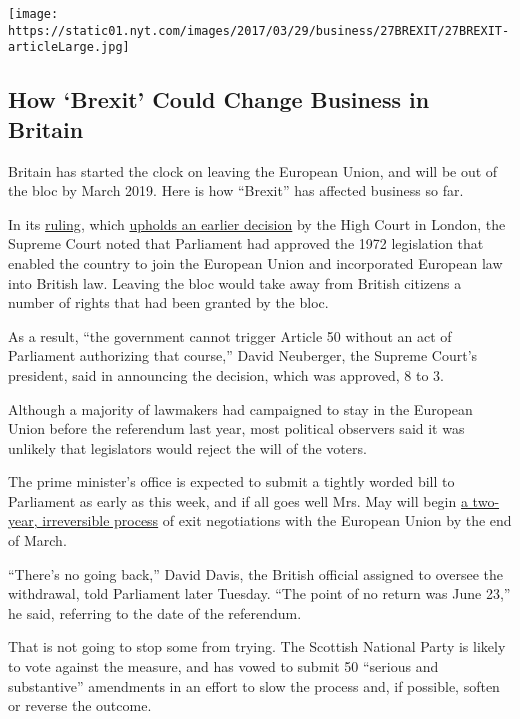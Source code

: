 \href{https://www.nytimes.com/interactive/2016/business/international/brexit-uk-what-happens-business.html}{}

\texttt{[image: https://static01.nyt.com/images/2017/03/29/business/27BREXIT/27BREXIT-articleLarge.jpg]}

\hypertarget{how-brexit-could-change-business-in-britain}{%
\subsection{How `Brexit' Could Change Business in
Britain}\label{how-brexit-could-change-business-in-britain}}

Britain has started the clock on leaving the European Union, and will be
out of the bloc by March 2019. Here is how ``Brexit'' has affected
business so far.

In its
\href{https://www.supremecourt.uk/cases/docs/uksc-2016-0196-judgment.pdf}{ruling},
which
\href{https://www.nytimes.com/2016/11/04/world/europe/uk-brexit-vote-parliament.html}{upholds
an earlier decision} by the High Court in London, the Supreme Court
noted that Parliament had approved the 1972 legislation that enabled the
country to join the European Union and incorporated European law into
British law. Leaving the bloc would take away from British citizens a
number of rights that had been granted by the bloc.

As a result, ``the government cannot trigger Article 50 without an act
of Parliament authorizing that course,'' David Neuberger, the Supreme
Court's president, said in announcing the decision, which was approved,
8 to 3.

Although a majority of lawmakers had campaigned to stay in the European
Union before the referendum last year, most political observers said it
was unlikely that legislators would reject the will of the voters.

The prime minister's office is expected to submit a tightly worded bill
to Parliament as early as this week, and if all goes well Mrs. May will
begin
\href{https://www.nytimes.com/2017/01/17/world/europe/brexit-theresa-may-uk-eu.html}{a
two-year, irreversible process} of exit negotiations with the European
Union by the end of March.

``There's no going back,'' David Davis, the British official assigned to
oversee the withdrawal, told Parliament later Tuesday. ``The point of no
return was June 23,'' he said, referring to the date of the referendum.

That is not going to stop some from trying. The Scottish National Party
is likely to vote against the measure, and has vowed to submit 50
``serious and substantive'' amendments in an effort to slow the process
and, if possible, soften or reverse the outcome.

